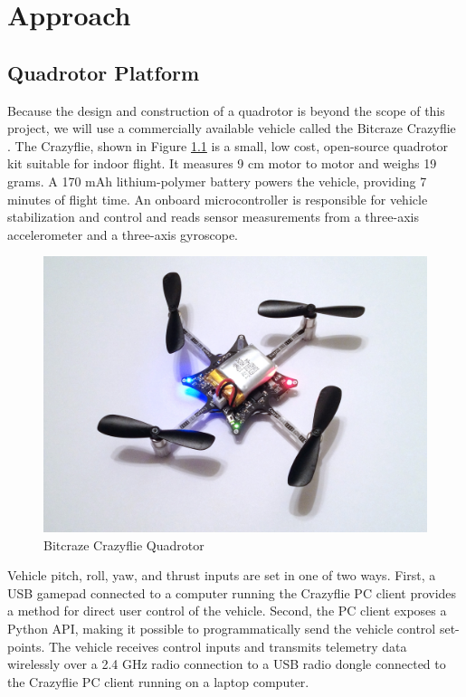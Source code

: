 \chapter{Approach}\label{approach}

\section{Quadrotor Platform}
Because the design and construction of a quadrotor is beyond the scope of  this project, we will use a commercially available vehicle called the Bitcraze Crazyflie \cite{bitcraze}. The Crazyflie, shown in Figure \ref{fig:quad} is a small, low cost, open-source quadrotor kit suitable for indoor flight. It measures 9 cm motor to motor and weighs 19 grams. A 170 mAh lithium-polymer battery powers the vehicle, providing 7 minutes of flight time. An onboard microcontroller is responsible for vehicle stabilization and control and reads sensor measurements from a three-axis accelerometer and a three-axis gyroscope.
\begin{figure}[!htb]
\centering \includegraphics[scale=.11]{../fig/crazyflie.jpg}
\caption{Bitcraze Crazyflie Quadrotor}
\label{fig:quad}
\end{figure}

Vehicle pitch, roll, yaw, and thrust inputs are set in one of two ways. First, a USB gamepad connected to a computer running the Crazyflie PC client provides a method for direct user control of the vehicle. Second, the PC client exposes a Python API, making it possible to programmatically send the vehicle control set-points. The vehicle receives control inputs and transmits telemetry data wirelessly over a 2.4 GHz radio connection to a USB radio dongle connected to the Crazyflie PC client running on a laptop computer.

